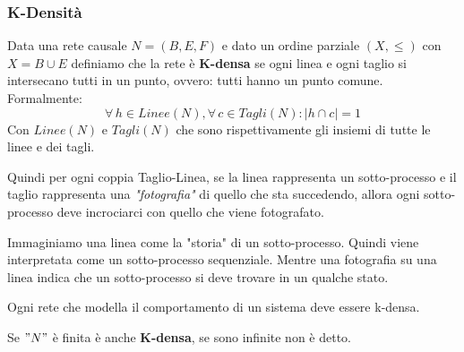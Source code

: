 \subsubsection{K-Densità}
\begin{definizione}
  Data una rete causale $N=(B, E, F)$ e dato un ordine parziale $(X, \leq)$ con
  $X=B\cup E$ definiamo che la rete è \textbf{K-densa} se ogni linea e ogni
  taglio si intersecano tutti in un punto, ovvero: tutti hanno un punto comune. Formalmente:
  \[\forall\, h\in Linee(N),\forall\, c\in Tagli(N):|h\cap c|=1\]
  Con $Linee(N)$ e $Tagli(N)$ che sono rispettivamente gli insiemi di tutte le
  linee e dei tagli.\\
  \end{definizione} \vspace{5mm} %
  Quindi per ogni coppia Taglio-Linea, se la linea rappresenta un sotto-processo e il taglio rappresenta una \textit{"fotografia"} di quello che sta succedendo, allora ogni sotto-processo deve incrociarci con quello che viene fotografato.
  \begin{nota}
  Immaginiamo una linea come la "storia" di un sotto-processo. Quindi viene interpretata come un sotto-processo sequenziale. Mentre una fotografia su una linea indica che un sotto-processo si deve trovare in un qualche stato.
  \end{nota}
\begin{nota}
Ogni rete che modella il comportamento di un sistema deve essere k-densa.
\end{nota}
  \begin{nota}
  Se $"N"$ è finita è anche \textbf{K-densa}, se sono infinite non è detto.
\end{nota}
